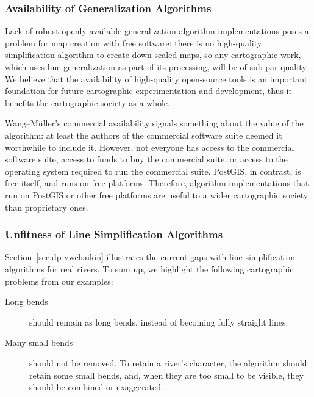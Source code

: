 \documentclass[a4paper]{article}
\newcommand{\WM}{Wang--M{\"u}ller}
\begin{document}
\subsubsection{Availability of Generalization Algorithms}

Lack of robust openly available generalization algorithm implementations poses
a problem for map creation with free software: there is no high-quality
simplification algorithm to create down-scaled maps, so any cartographic work,
which uses line generalization as part of its processing, will be of sub-par
quality. We believe that the availability of high-quality open-source tools is an
important foundation for future cartographic experimentation and development,
thus it benefits the cartographic society as a whole.

{\WM}'s commercial availability signals something about the value of the
algorithm: at least the authors of the commercial software suite deemed it
worthwhile to include it. However, not everyone has access to the commercial
software suite, access to funds to buy the commercial suite, or access to the
operating system required to run the commercial suite. PostGIS, in contrast, is
free itself, and runs on free platforms. Therefore, algorithm
implementations that run on PostGIS or other free platforms are useful to a
wider cartographic society than proprietary ones.

\subsubsection{Unfitness of Line Simplification Algorithms}

Section~\ref{sec:dp-vwchaikin} illustrates the current gaps with line
simplification algorithms for real rivers. To sum up, we highlight the
following cartographic problems from our examples:

\begin{description}

    \item[Long bends] should remain as long bends, instead of becoming fully
        straight lines.

    \item[Many small bends] should not be removed. To retain a river's character,
        the algorithm should retain some small bends, and, when they are too
        small to be visible, they should be combined or exaggerated.

\end{description}
\end{document}
